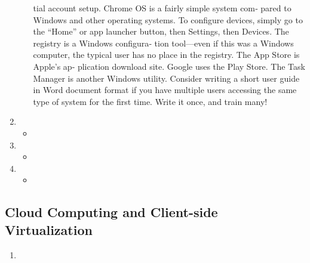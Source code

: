 \documentclass{article}
\begin{document}
\begin{enumerate}
\begin{itemize}
tial account setup. Chrome OS is a fairly simple system com‐
pared to Windows and other operating systems. To configure
devices, simply go to the “Home” or app launcher button, then
Settings, then Devices. The registry is a Windows configura‐
tion tool—even if this was a Windows computer, the typical
user has no place in the registry. The App Store is Apple’s ap‐
plication download site. Google uses the Play Store. The Task
Manager is another Windows utility. Consider writing a short
user guide in Word document format if you have multiple
users accessing the same type of system for the first time.
Write it once, and train many!
    \end{itemize}
    \item 
    \begin{itemize}
        \item 
    \end{itemize}
    \item 
    \begin{itemize}
        \item 
    \end{itemize}
    \item 
    \begin{itemize}
        \item 
    \end{itemize}
\end{enumerate}
\subsection{Cloud Computing and
Client-side Virtualization}
\begin{enumerate}
    \item 
\end{enumerate}
\end{document}
